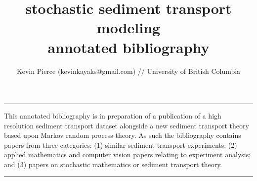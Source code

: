 \documentclass [12pt]{article}
\title{\textbf{stochastic sediment transport modeling} \\ annotated bibliography}
\author{Kevin Pierce (kevinkayaks@gmail.com) // University of British Columbia}
\date{}
\begin{document}
\maketitle
\vspace{-1cm}
\noindent\rule{\textwidth}{1pt}
\vspace{-0.25cm}

\noindent This annotated bibliography is in preparation of a publication of a high resolution sediment transport dataset alongside a new sediment transport theory based upon Markov random process theory. As such the bibliography contains papers from three categories: (1) similar sediment transport experiments; (2) applied mathematics and computer vision papers relating to experiment analysis; and (3) papers on stochastic mathematics or sediment transport theory.\\  
\noindent\rule{\textwidth}{1pt}
\nocite{*}


\end{document}
